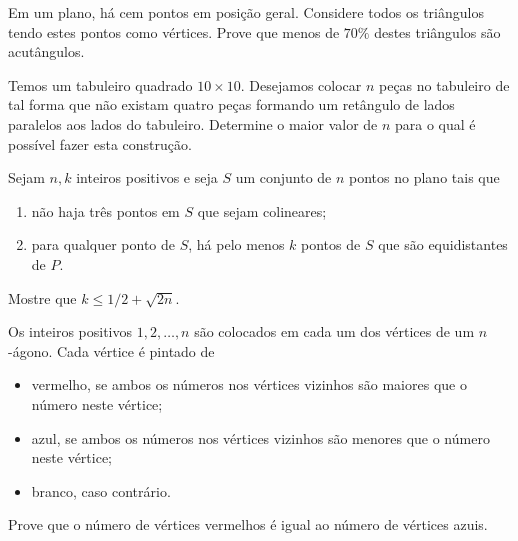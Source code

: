 \begin{questao}
  Em um plano, há cem pontos em posição geral. Considere todos os triângulos
  tendo estes pontos como vértices. Prove que menos de $70\%$ destes triângulos
  são acutângulos.
\end{questao}

\begin{questao}
  Temos um tabuleiro quadrado $10 \times 10$. Desejamos colocar $n$ peças no
  tabuleiro de tal forma que não existam quatro peças formando um retângulo de
  lados paralelos aos lados do tabuleiro. Determine o maior valor de $n$ para o
  qual é possível fazer esta construção.
\end{questao}

\begin{questao}
  Sejam $n,k$ inteiros positivos e seja $S$ um conjunto de $n$
  pontos no plano tais que
  \begin{enumerate} %
    \item não haja três pontos em $S$ que sejam colineares;

    \item para qualquer ponto de $S$, há pelo menos $k$ pontos
    de $S$ que são equidistantes de $P$.
  \end{enumerate}

  Mostre que $k \leq 1/2 + \sqrt{2n}$.
\end{questao}

\begin{questao}
  Os inteiros positivos $1,2,\ldots,n$ são colocados em cada um dos
  vértices de um $n$-ágono. Cada vértice é pintado de
  \begin{itemize}
    \item vermelho, se ambos os números nos vértices vizinhos são
    maiores que o número neste vértice;

    \item azul, se ambos os números nos vértices vizinhos são menores
    que o número neste vértice;

    \item branco, caso contrário.
  \end{itemize}

  Prove que o número de vértices vermelhos é igual ao número de
  vértices azuis.
\end{questao}

